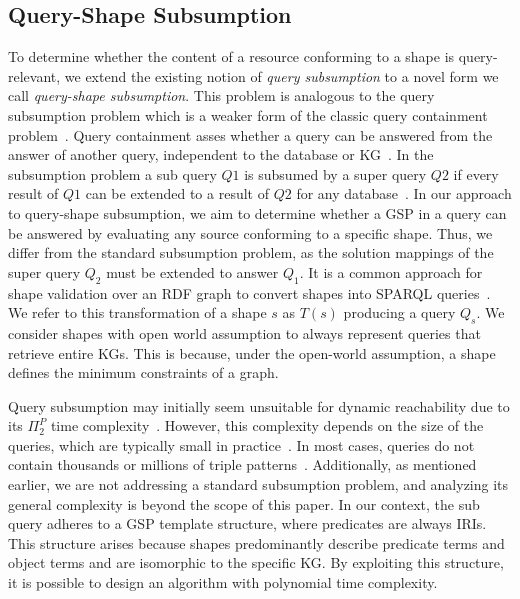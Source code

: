 \subsection{Query-Shape Subsumption}\label{sec:containment}
To determine whether the content of a resource conforming to a shape is query-relevant, we extend the existing notion of \emph{query subsumption} to a novel form we call \emph{query-shape subsumption}.
This problem is analogous to the query subsumption problem which is a weaker form of the classic query containment problem~\cite{Spasi2023}.
Query containment asses whether a query can be answered from the answer of another query,  independent to the database or KG~\cite{afariQCE}.
In the subsumption problem a sub query $Q1$ is subsumed by a super query $Q2$  if every result of $Q1$ can be extended to a result of $Q2$ for any database~\cite{Spasi2023, Pichler2014}.
In our approach to query-shape subsumption, we aim to determine whether a GSP in a query can be answered by evaluating any source conforming to a specific shape.
Thus, we differ from the standard subsumption problem, as the solution mappings of the super query $Q_2$ must be extended to answer $Q_1$.
It is a common approach for shape validation over an RDF graph to convert shapes into SPARQL queries~\cite{labragayo2017validatingdescribinglinkeddata, Corman2019,Prestamo2023, spapeExpressionConvert}.~
We refer to this transformation of a shape $s$ as $T(s)$ producing a query $Q_s$.
We consider shapes with open world assumption to always represent queries that retrieve entire KGs.
This is because, under the open-world assumption, a shape defines the minimum constraints of a graph.

Query subsumption may initially seem unsuitable for dynamic reachability due to its $\Pi^P_2$ time complexity~\cite{Pichler2014, Letelier2013}.  
However, this complexity depends on the size of the queries, which are typically small in practice~\cite{Doan2012}.  
In most cases, queries do not contain thousands or millions of triple patterns~\cite{Bonifati2019}.  
Additionally, as mentioned earlier, we are not addressing a standard subsumption problem, and analyzing its general complexity is beyond the scope of this paper.
In our context, the sub query adheres to a GSP template structure, where predicates are always IRIs.
This structure arises because shapes predominantly describe predicate terms and object terms and are isomorphic to the specific KG.
By exploiting this structure, it is possible to design an algorithm with polynomial time complexity.

